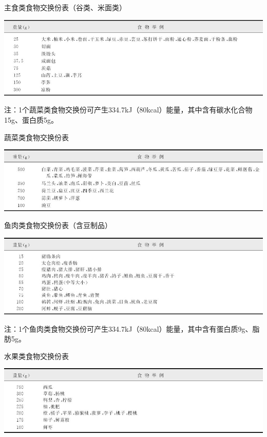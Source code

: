 \begin{table}[htbp]
\centering
\caption{主食类食物交换份表（谷类、米面类）}
\label{tab3-17}
\includegraphics{./images/Image00033.jpg}
\end{table}

注：1个蔬菜类食物交换份可产生334.7kJ（80kcal）能量，其中含有碳水化合物15g、蛋白质5g。

\begin{table}[htbp]
\centering
\caption{蔬菜类食物交换份表}
\label{tab3-18}
\includegraphics{./images/Image00034.jpg}
\end{table}

\begin{table}[htbp]
\centering
\caption{鱼肉类食物交换份表（含豆制品）}
\label{tab3-19}
\includegraphics{./images/Image00035.jpg}
\end{table}

注：1个鱼肉类食物交换份可产生334.7kJ（80kcal）能量，其中含有蛋白质9g、脂肪5g。

\begin{table}[htbp]
\centering
\caption{水果类食物交换份表}
\label{tab3-20}
\includegraphics{./images/Image00036.jpg}
\end{table}

